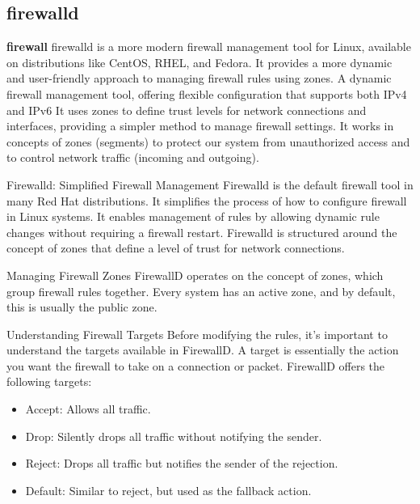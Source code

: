 \subsection{firewalld}
\textbf{firewall} \newline 
firewalld is a more modern firewall management tool for Linux, available on distributions like CentOS, RHEL, and Fedora. 
It provides a more dynamic and user-friendly approach to managing firewall rules using zones.
A dynamic firewall management tool, offering flexible configuration that supports both IPv4 and IPv6
It uses zones to define trust levels for network connections and interfaces, providing a simpler method to manage firewall settings. 
It works in concepts of zones (segments) to protect our system from unauthorized access and to control network traffic (incoming and outgoing).  
%

Firewalld: Simplified Firewall Management
Firewalld is the default firewall tool in many Red Hat distributions. 
It simplifies the process of how to configure firewall in Linux systems. It enables management of rules by allowing 
dynamic rule changes without requiring a firewall restart. 
Firewalld is structured around the concept of zones that define a level of trust for network connections.


Managing Firewall Zones
FirewallD operates on the concept of zones, which group firewall rules together. 
Every system has an active zone, and by default, this is usually the public zone. 


Understanding Firewall Targets
Before modifying the rules, it’s important to understand the targets available in FirewallD. 
A target is essentially the action you want the firewall to take on a connection or packet. FirewallD offers the following targets:
\begin{itemize}
    \item Accept: Allows all traffic.
    \item Drop: Silently drops all traffic without notifying the sender. 
    \item Reject: Drops all traffic but notifies the sender of the rejection. 
    \item Default: Similar to reject, but used as the fallback action.
\end{itemize}


